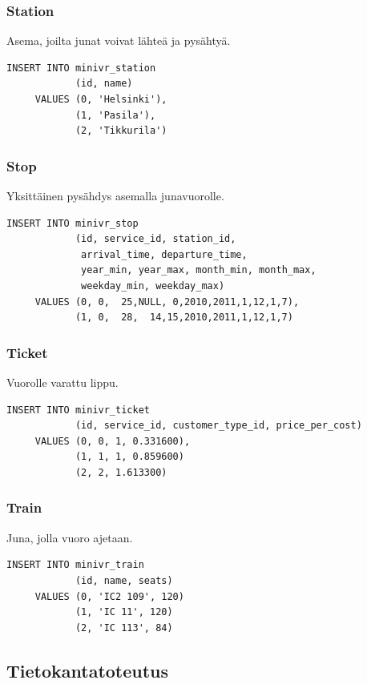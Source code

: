 \documentclass[a4paper,twoside,titlepage,12pt]{article}
\begin{document}
\subsubsection{Station}

Asema, joilta junat voivat lähteä ja pysähtyä.
\begin{lstlisting}
INSERT INTO minivr_station
            (id, name)
     VALUES (0, 'Helsinki'),
            (1, 'Pasila'),
            (2, 'Tikkurila')
\end{lstlisting}

\subsubsection{Stop}

Yksittäinen pysähdys asemalla junavuorolle.
\begin{lstlisting}
INSERT INTO minivr_stop
            (id, service_id, station_id,
             arrival_time, departure_time,
             year_min, year_max, month_min, month_max,
             weekday_min, weekday_max)
     VALUES (0, 0,  25,NULL, 0,2010,2011,1,12,1,7),
            (1, 0,  28,  14,15,2010,2011,1,12,1,7)
\end{lstlisting}

\subsubsection{Ticket}

Vuorolle varattu lippu.
\begin{lstlisting}
INSERT INTO minivr_ticket
            (id, service_id, customer_type_id, price_per_cost)
     VALUES (0, 0, 1, 0.331600),
            (1, 1, 1, 0.859600)
            (2, 2, 1.613300)
\end{lstlisting}

\subsubsection{Train}

Juna, jolla vuoro ajetaan.
\begin{lstlisting}
INSERT INTO minivr_train
            (id, name, seats)
     VALUES (0, 'IC2 109', 120)
            (1, 'IC 11', 120)
            (2, 'IC 113', 84)
\end{lstlisting}


\subsection{Tietokantatoteutus}
\end{document}
